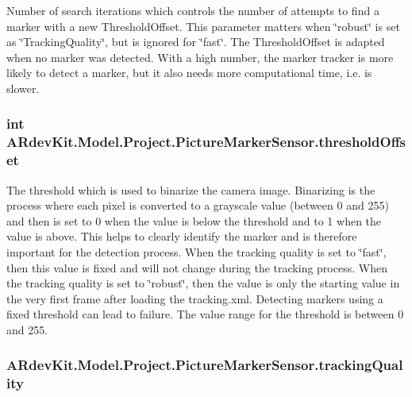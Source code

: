Number of search iterations which controls the number of attempts to find a marker with a new Threshold\-Offset. This parameter matters when \char`\"{}robust\char`\"{} is set as \char`\"{}\-Tracking\-Quality\char`\"{}, but is ignored for \char`\"{}fast\char`\"{}. The Threshold\-Offset is adapted when no marker was detected. With a high number, the marker tracker is more likely to detect a marker, but it also needs more computational time, i.\-e. is slower. 

\hypertarget{class_a_rdev_kit_1_1_model_1_1_project_1_1_picture_marker_sensor_ae8164ddea1bcb20ca7f5b3e646b6c924}{
\subsubsection[{threshold\-Offset}]{\setlength{\rightskip}{0pt plus 5cm}int A\-Rdev\-Kit.\-Model.\-Project.\-Picture\-Marker\-Sensor.\-threshold\-Offset\hspace{0.3cm}{\ttfamily [protected]}}}\label{class_a_rdev_kit_1_1_model_1_1_project_1_1_picture_marker_sensor_ae8164ddea1bcb20ca7f5b3e646b6c924}


The threshold which is used to binarize the camera image. Binarizing is the process where each pixel is converted to a grayscale value (between 0 and 255) and then is set to 0 when the value is below the threshold and to 1 when the value is above. This helps to clearly identify the marker and is therefore important for the detection process. When the tracking quality is set to \char`\"{}fast\char`\"{}, then this value is fixed and will not change during the tracking process. When the tracking quality is set to \char`\"{}robust\char`\"{}, then the value is only the starting value in the very first frame after loading the tracking.\-xml. Detecting markers using a fixed threshold can lead to failure. The value range for the threshold is between 0 and 255. 

\hypertarget{class_a_rdev_kit_1_1_model_1_1_project_1_1_picture_marker_sensor_aca44e5fc01c413ccf52a6566ee98ec70}{
\subsubsection[{tracking\-Quality}]{ A\-Rdev\-Kit.\-Model.\-Project.\-Picture\-Marker\-Sensor.\-tracking\-Quality\hspace{0.3cm}{\ttfamily [protected]}}}\label{class_a_rdev_kit_1_1_model_1_1_project_1_1_picture_marker_sensor_aca44e5fc01c413ccf52a6566ee98ec70}


